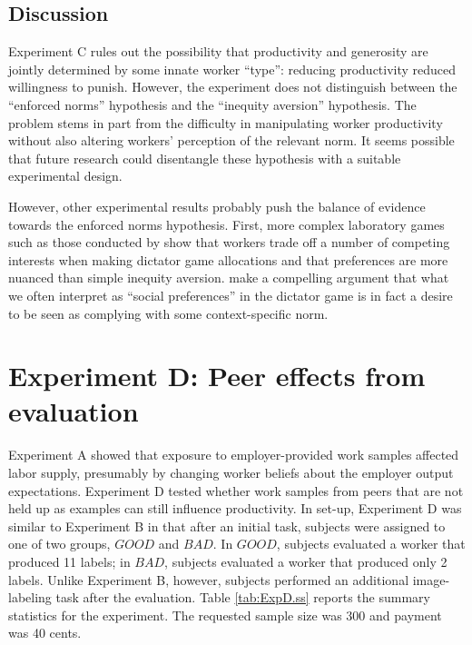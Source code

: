 \documentclass[12pt]{article}
\begin{document}
\subsection{Discussion}
Experiment C rules out the possibility that productivity and
generosity are jointly determined by some innate worker ``type'':
reducing productivity reduced willingness to punish. However, the
experiment does not distinguish between the ``enforced norms''
hypothesis and the ``inequity aversion'' hypothesis. The problem stems
in part from the difficulty in manipulating worker productivity
without also altering workers' perception of the relevant norm. It
seems possible that future research could disentangle these hypothesis
with a suitable experimental design.

However, other experimental results probably push the balance of
evidence towards the enforced norms hypothesis. First, more complex
laboratory games such as those conducted by
\cite{charness2002understanding} show that workers trade off a number
of competing interests when making dictator game allocations and that
preferences are more nuanced than simple inequity
aversion. \cite{list2008examining} make a compelling argument that
what we often interpret as ``social preferences'' in the dictator game
is in fact a desire to be seen as complying with some context-specific
norm.

\section{Experiment D: Peer effects from evaluation}

Experiment A showed that exposure to employer-provided work samples
affected labor supply, presumably by changing worker beliefs about the
employer output expectations. Experiment D tested whether work samples
from peers that are not held up as examples can still influence
productivity. In set-up, Experiment D was similar to Experiment B in
that after an initial task, subjects were assigned to one of two
groups, $GOOD$ and $BAD$. In $GOOD$, subjects evaluated a worker that
produced 11 labels; in $BAD$, subjects evaluated a worker that
produced only 2 labels. Unlike Experiment B, however, subjects
performed an additional image-labeling task after the
evaluation. Table \ref{tab:ExpD.ss} reports the summary statistics for
the experiment. The requested sample size was $300$ and payment was 40
cents.
\end{document}
